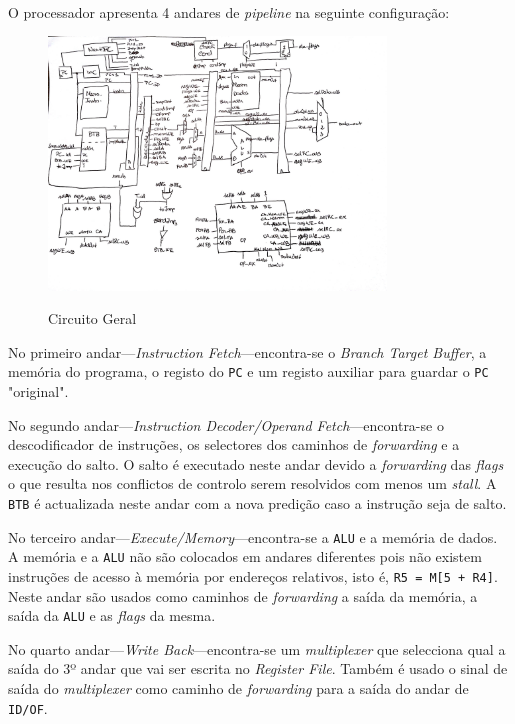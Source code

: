 \paragraph{} O processador apresenta 4 andares de \textit{pipeline} na seguinte configuração:

\begin{figure}[H]
    \centering
    \includegraphics[width=0.8\textwidth]{./circuito.jpg}~\\[1cm]
    \caption{Circuito Geral}
    \label{fig:circuito}
\end{figure}

No primeiro andar---\textit{Instruction Fetch}---encontra-se o \textit{Branch Target Buffer}, a memória do programa, o registo do \texttt{PC} e um registo auxiliar para guardar o \texttt{PC} "original". 

No segundo andar---\textit{Instruction Decoder/Operand Fetch}---encontra-se o descodificador de instruções, os selectores dos caminhos de \textit{forwarding} e a execução do salto. O salto é executado neste andar devido a \textit{forwarding} das \textit{flags} o que resulta nos conflictos de controlo serem resolvidos com menos um \textit{stall}. A \texttt{BTB} é actualizada neste andar com a nova predição caso a instrução seja de salto.

No terceiro andar---\textit{Execute/Memory}---encontra-se a \texttt{ALU} e a memória de dados. A memória e a \texttt{ALU} não são colocados em andares diferentes pois não existem instruções de acesso à memória por endereços relativos, isto é, \texttt{R5 = M[5 + R4]}. Neste andar são usados como caminhos de \textit{forwarding} a saída da memória, a saída da \texttt{ALU} e as \textit{flags} da mesma.

No quarto andar---\textit{Write Back}---encontra-se um \textit{multiplexer} que selecciona qual a saída do 3º andar que vai ser escrita no \textit{Register File}. Também é usado o sinal de saída do \textit{multiplexer} como caminho de \textit{forwarding} para a saída do andar de \texttt{ID/OF}.

